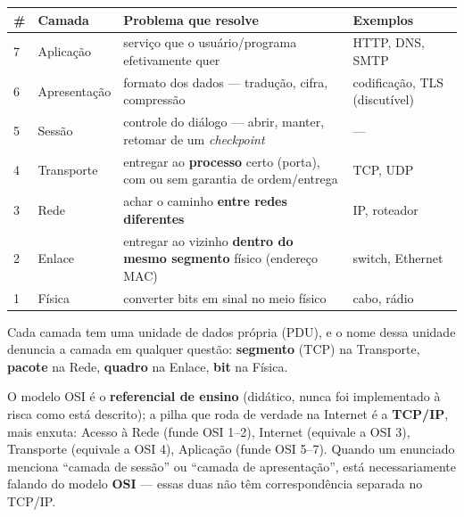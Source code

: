 \begin{conceito}
\begin{center}
\begin{tabular}{@{}p{0.6cm}p{2.2cm}p{4.4cm}p{3.4cm}@{}}
\toprule
\# & \textbf{Camada} & \textbf{Problema que resolve} & \textbf{Exemplos} \\
\midrule
7 & Aplicação & serviço que o usuário/programa efetivamente quer & HTTP,
DNS, SMTP \\
6 & Apresentação & formato dos dados --- tradução, cifra, compressão &
codificação, TLS (discutível) \\
5 & Sessão & controle do diálogo --- abrir, manter, retomar de um
\textit{checkpoint} & --- \\
4 & Transporte & entregar ao \textbf{processo} certo (porta), com ou sem
garantia de ordem/entrega & TCP, UDP \\
3 & Rede & achar o caminho \textbf{entre redes diferentes} & IP, roteador \\
2 & Enlace & entregar ao vizinho \textbf{dentro do mesmo segmento} físico
(endereço MAC) & switch, Ethernet \\
1 & Física & converter bits em sinal no meio físico & cabo, rádio \\
\bottomrule
\end{tabular}
\end{center}

Cada camada tem uma unidade de dados própria (PDU), e o nome dessa unidade
denuncia a camada em qualquer questão: \textbf{segmento} (TCP) na
Transporte, \textbf{pacote} na Rede, \textbf{quadro} na Enlace, \textbf{bit}
na Física.
\end{conceito}

\begin{conceito}
O modelo OSI é o \textbf{referencial de ensino} (didático, nunca foi
implementado à risca como está descrito); a pilha que roda de verdade na
Internet é a \textbf{TCP/IP}, mais enxuta: Acesso à Rede (funde OSI 1--2),
Internet (equivale a OSI 3), Transporte (equivale a OSI 4), Aplicação (funde
OSI 5--7). Quando um enunciado menciona “camada de sessão” ou “camada de
apresentação”, está necessariamente falando do modelo \textbf{OSI} --- essas
duas não têm correspondência separada no TCP/IP.
\end{conceito}

